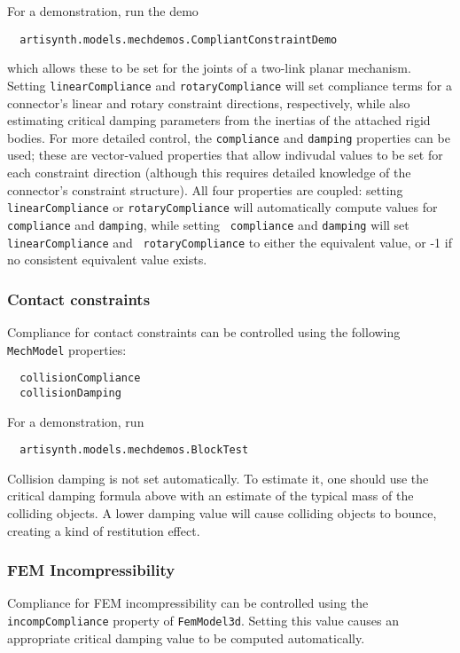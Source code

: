 \documentclass{article}
\begin{document}
For a demonstration, run the demo 
\begin{verbatim}
  artisynth.models.mechdemos.CompliantConstraintDemo
\end{verbatim}
which allows these to be set for the joints of a two-link planar
mechanism. Setting {\tt linearCompliance} and {\tt rotaryCompliance}
will set compliance terms for a connector's linear and rotary
constraint directions, respectively, while also estimating critical
damping parameters from the inertias of the attached rigid bodies.  For
more detailed control, the {\tt compliance} and {\tt damping}
properties can be used; these are vector-valued properties that allow
indivudal values to be set for each constraint direction (although
this requires detailed knowledge of the connector's constraint
structure). All four properties are coupled: setting {\tt
linearCompliance} or {\tt rotaryCompliance} will automatically compute
values for {\tt compliance} and {\tt damping}, while setting {\tt
compliance} and {\tt damping} will set {\tt linearCompliance} and {\tt
rotaryCompliance} to either the equivalent value, or -1 if no
consistent equivalent value exists.

\subsubsection*{Contact constraints}

Compliance for contact constraints can be controlled using the
following {\tt MechModel} properties:

\begin{lstlisting}
  collisionCompliance
  collisionDamping
\end{lstlisting}

For a demonstration, run 
\begin{verbatim}
  artisynth.models.mechdemos.BlockTest
\end{verbatim}

Collision damping is not set automatically. To estimate it, one should
use the critical damping formula above with an estimate of the typical
mass of the colliding objects. A lower damping value will cause colliding
objects to bounce, creating a kind of restitution effect.

\subsubsection*{FEM Incompressibility}

Compliance for FEM incompressibility can be controlled using the {\tt
incompCompliance} property of {\tt FemModel3d}. Setting this value
causes an appropriate critical damping value to be computed
automatically.
\end{document}
